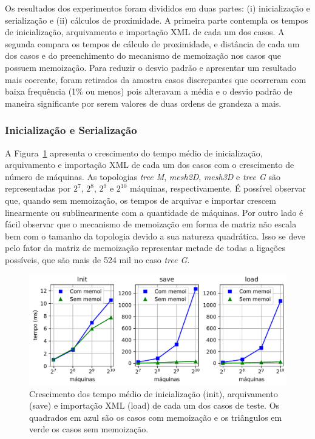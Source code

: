 Os resultados dos experimentos foram divididos em duas partes: (i) inicialização e serialização e (ii) cálculos de proximidade.
A primeira parte contempla os tempos de inicialização, arquivamento e importação XML de cada um dos casos.
A segunda compara os tempos de cálculo de proximidade, \hops e distância de cada um dos casos e do preenchimento do mecanismo de memoização nos casos que possuem memoização.
Para reduzir o desvio padrão e apresentar um resultado mais coerente, foram retirados da amostra casos discrepantes que ocorreram com baixa frequência (1\% ou menos) pois alteravam a média e o desvio padrão de maneira significante por serem valores de duas ordens de grandeza a mais.

\subsubsection{Inicialização e Serialização}

A Figura~\ref{fig:init_bench} apresenta o crescimento do tempo médio de inicialização, arquivamento e importação XML de cada um dos casos com o crescimento de número de máquinas.
As topologias \textit{tree M}, \textit{mesh2D}, \textit{mesh3D} e \textit{tree G} são representadas por $2^7$, $2^8$, $2^9$ e $2^{10}$ máquinas, respectivamente.
É possível observar que, quando sem memoização, os tempos de arquivar e importar crescem linearmente ou sublinearmente com a quantidade de máquinas.
Por outro lado é fácil observar que o mecanismo de memoização em forma de matriz não escala bem com o tamanho da topologia devido a sua natureza quadrática.
Isso se deve pelo fator da matriz de memoização representar metade de todas a ligações possíveis, que são mais de 524 mil no caso \textit{tree G}.

\begin{figure} [h]
\includegraphics[width=1.02\textwidth]{images/init_save_load.pdf}
\centering
\caption[Tempos de inicialização, arquivamento e importação XML.] {Crescimento dos tempo médio de inicialização (init), arquivamento (save) e importação XML (load) de cada um dos casos de teste. Os quadrados em azul são os casos com memoização e os triângulos em verde os casos sem memoização. }
\label{fig:init_bench}
\end{figure}

